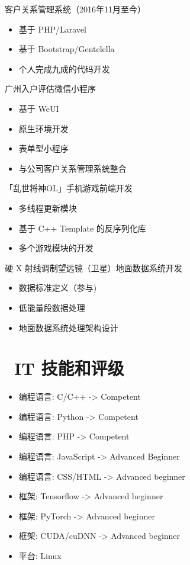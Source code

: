 \documentclass{resume}
\begin{document}
\begin{onehalfspacing}
客户关系管理系统（2016年11月至今）
\begin{itemize}
  \item 基于 PHP/Laravel
  \item 基于 Bootstrap/Gentelella
  \item 个人完成九成的代码开发
\end{itemize}
\end{onehalfspacing}
\begin{onehalfspacing}
广州入户评估微信小程序
\begin{itemize}
  \item 基于 WeUI
  \item 原生环境开发
  \item 表单型小程序
  \item 与公司客户关系管理系统整合
\end{itemize}
\end{onehalfspacing}

\begin{onehalfspacing}
「乱世将神OL」手机游戏前端开发
\begin{itemize}
  \item 多线程更新模块
  \item 基于 C++ Template 的反序列化库
  \item 多个游戏模块的开发
\end{itemize}
\end{onehalfspacing}

硬 X 射线调制望远镜（卫星）地面数据系统开发
\begin{itemize}
  \item 数据标准定义（参与)
  \item 低能量段数据处理
  \item 地面数据系统处理架构设计
\end{itemize}

\section{\faCogs\ IT 技能和评级}
\begin{itemize}[parsep=0.5ex]
  \item 编程语言: C/C++ -> Competent
  \item 编程语言: Python -> Competent
  \item 编程语言: PHP -> Competent
  \item 编程语言: JavaScript -> Advanced Beginner
  \item 编程语言: CSS/HTML -> Advanced beginner
  \item 框架: Tensorflow -> Advanced beginner
  \item 框架: PyTorch -> Advanced beginner
  \item 框架: CUDA/cuDNN -> Advanced beginner
  \item 平台: Linux
\end{itemize}
\end{document}
